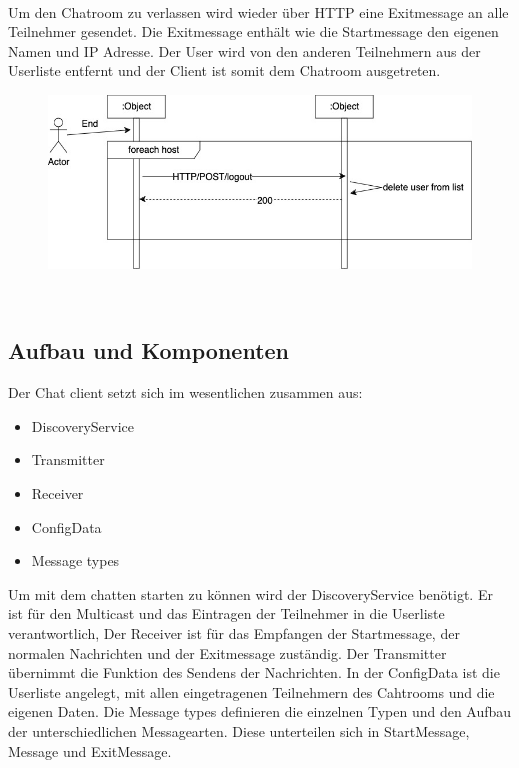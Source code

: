 \\
Um den Chatroom zu verlassen wird wieder über HTTP eine Exitmessage an alle Teilnehmer gesendet. Die Exitmessage enthält wie die Startmessage den eigenen Namen und IP Adresse.
Der User wird von den anderen Teilnehmern aus der Userliste entfernt und der Client ist somit dem Chatroom ausgetreten. 
\begin{figure}[h]
    \centering
    \includegraphics[scale=0.4]{Images/Exit_Sequenzdiagramm.jpg}
\end{figure}
\\

\subsection{Aufbau und Komponenten}
Der Chat client setzt sich im wesentlichen zusammen aus:
\begin{itemize}
    \item DiscoveryService
    \item Transmitter
    \item Receiver
    \item ConfigData
    \item Message types
\end{itemize} 
Um mit dem chatten starten zu können wird der DiscoveryService benötigt. 
Er ist für den Multicast und das Eintragen der Teilnehmer in die Userliste verantwortlich,
Der Receiver ist für das Empfangen der Startmessage, der normalen Nachrichten und der Exitmessage zuständig.
Der Transmitter übernimmt die Funktion des Sendens der Nachrichten. 
In der ConfigData ist die Userliste angelegt, mit allen eingetragenen Teilnehmern des Cahtrooms und die eigenen Daten.
Die Message types definieren die einzelnen Typen und den Aufbau der unterschiedlichen Messagearten. Diese unterteilen sich in StartMessage, Message und ExitMessage.


